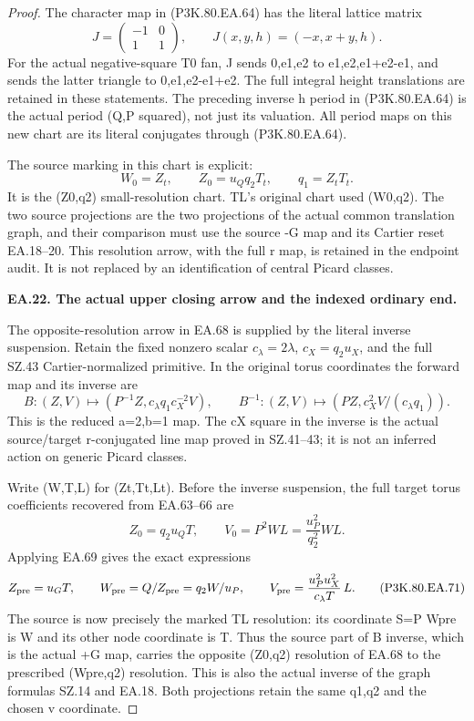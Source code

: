 \begin{proof}
The character map in (P3K.80.EA.64) has the literal lattice matrix
\[
 J=\begin{pmatrix}-1&0\\1&1\end{pmatrix},\qquad
 \widehat J(x,y,h)=(-x,x+y,h).
 \tag{P3K.80.EA.67}
\]
For the actual negative-square T0 fan, J sends
{0,e1,e2} to {e1,e2,e1+e2}-e1, and sends the latter
triangle to {0,e1,e2}-e1+e2. The full integral height
translations are retained in these statements. The preceding
inverse h period in (P3K.80.EA.64) is the actual period (Q,P squared),
not just its valuation. All period maps on this new chart are
its literal conjugates through (P3K.80.EA.64).

The source marking in this chart is explicit:
\[
 W_0=Z_t,\qquad Z_0=u_Q q_2 T_t,\qquad q_1=Z_tT_t .
 \tag{P3K.80.EA.68}
\]
It is the (Z0,q2) small-resolution chart. TL's original
chart used (W0,q2). The two source projections are the two
projections of the actual common translation graph, and
their comparison must use the source -G map and its
Cartier reset EA.18--20. This resolution arrow, with the
full r map, is retained in the endpoint audit. It is not
replaced by an identification of central Picard classes.


\par\medskip\noindent\textbf{EA.22. The actual upper closing arrow and the indexed ordinary end.}\par\nopagebreak[4]

The opposite-resolution arrow in EA.68 is supplied by the
literal inverse suspension. Retain the fixed nonzero scalar
\(c_\lambda=2\lambda\), \(c_X=q_2u_X\), and the full
SZ.43 Cartier-normalized primitive. In the original torus
coordinates the forward map and its inverse are
\[
 B:(Z,V)\longmapsto
       (P^{-1}Z,c_\lambda q_1c_X^{-2}V),\qquad
 B^{-1}:(Z,V)\longmapsto
       (PZ,c_X^2V/(c_\lambda q_1)).
 \tag{P3K.80.EA.69}
\]
This is the reduced a=2,b=1 map. The cX square in the
inverse is the actual source/target r-conjugated line
map proved in SZ.41--43; it is not an inferred action
on generic Picard classes.

Write (W,T,L) for (Zt,Tt,Lt). Before the inverse
suspension, the full target torus coefficients recovered
from EA.63--66 are
\[
 Z_0=q_2u_QT,\qquad V_0=P^2WL
                  =\frac{u_P^2}{q_2^2}WL .
 \tag{P3K.80.EA.70}
\]
Applying EA.69 gives the exact expressions
\[
 Z_{\rm pre}=u_GT,\qquad
 W_{\rm pre}=Q/Z_{\rm pre}=q_2W/u_P,\qquad
 V_{\rm pre}=\frac{u_P^2u_X^2}{c_\lambda T}\,L.
 \tag{P3K.80.EA.71}
\]
The source is now precisely the marked TL resolution:
its coordinate S=P Wpre is W and its other node
coordinate is T. Thus the source part of B inverse,
which is the actual +G map, carries the opposite
(Z0,q2) resolution of EA.68 to the prescribed
(Wpre,q2) resolution. This is also the actual inverse
of the graph formulas SZ.14 and EA.18. Both projections
retain the same q1,q2 and the chosen v coordinate.


\end{proof}
